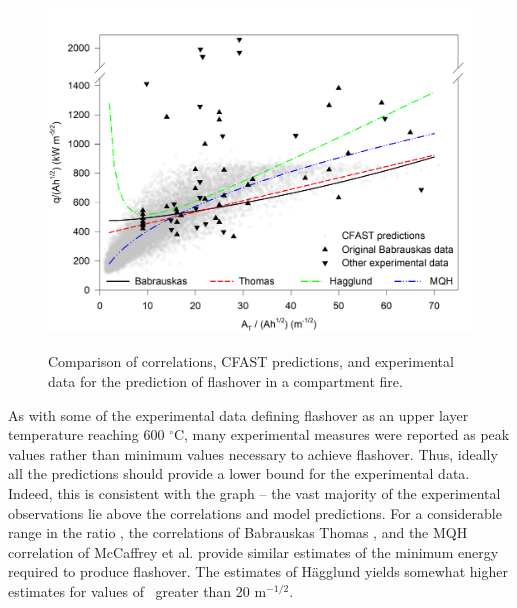 \begin{figure}
\begin{center}
\includegraphics[width=6.0000in]{FIGURES/flashover.pdf}\\
\end{center}
\caption{Comparison of correlations, CFAST predictions, and experimental data for the prediction of flashover in a compartment fire.}
 \label{figValidFlashover}
\end{figure}

As with some of the experimental data defining flashover as an upper layer temperature reaching 600 $^{\circ}$C, many experimental measures were reported as peak values rather than minimum values necessary to achieve flashover. Thus, ideally all the predictions should provide a lower bound for the experimental data. Indeed, this is consistent with the graph -- the vast majority of the experimental observations lie above the correlations and model predictions. For a considerable range in the ratio \asqh, the correlations of Babrauskas \cite{Valid:Babrauskas_Flashover} Thomas \cite{Thomas:1981fk}, and the MQH correlation of McCaffrey et al. \cite{McCaffrey:1981uq} provide similar estimates of the minimum energy required to produce flashover. The estimates of H\"{a}gglund \cite{Hagglund:1980} yields somewhat higher estimates for values of \asqh  \, greater than 20 m$^{-1/2}$.

